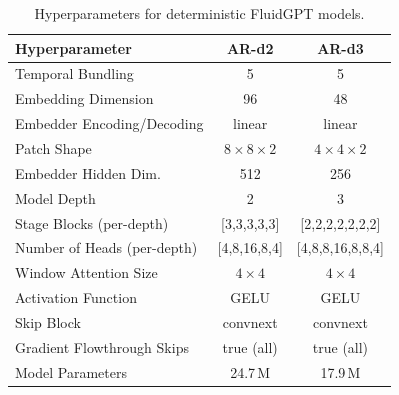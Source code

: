 
\begin{table}[H]
\centering
\caption{Hyperparameters for deterministic FluidGPT models.}
\label{tab:fluidgpt_hparams_det}
\begin{tabular}{lcc}
\toprule
\textbf{Hyperparameter} & \textbf{AR-d2} & \textbf{AR-d3} \\
\midrule
Temporal Bundling             & 5            & 5            \\
Embedding Dimension           & 96           & 48           \\
Embedder Encoding/Decoding    & linear       & linear       \\
Patch Shape                   & $8{\times}8{\times}2$ & $4{\times}4{\times}2$ \\
Embedder Hidden Dim.          & 512          & 256          \\
Model Depth                   & 2            & 3            \\
Stage Blocks (per-depth)      & [3,3,3,3,3]  & [2,2,2,2,2,2,2] \\
Number of Heads (per-depth)   & [4,8,16,8,4] & [4,8,8,16,8,8,4] \\
Window Attention Size         & $4{\times}4$ & $4{\times}4$ \\
Activation Function           & GELU         & GELU         \\
Skip Block                    & convnext     & convnext     \\
Gradient Flowthrough Skips    & true (all)   & true (all)   \\
Model Parameters              & 24.7\,M      & 17.9\,M      \\
\bottomrule
\end{tabular}
\end{table}

